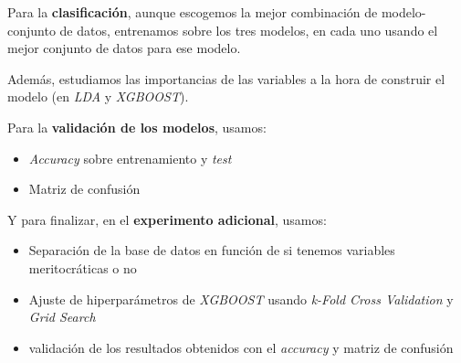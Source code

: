 \documentclass[11pt]{article}
\begin{document}
Para la \textbf{clasificación}, aunque escogemos la mejor combinación de modelo-conjunto de datos, entrenamos sobre los tres modelos, en cada uno usando el mejor conjunto de datos para ese modelo.

Además, estudiamos las importancias de las variables a la hora de construir el modelo (en \textit{LDA} y \textit{XGBOOST}).

Para la \textbf{validación de los modelos}, usamos:

\begin{itemize}
    \item \textit{Accuracy} sobre entrenamiento y \textit{test}
    \item Matriz de confusión
\end{itemize}

Y para finalizar, en el \textbf{experimento adicional}, usamos:

\begin{itemize}
    \item Separación de la base de datos en función de si tenemos variables meritocráticas o no
    \item Ajuste de hiperparámetros de \textit{XGBOOST} usando \textit{k-Fold Cross Validation} y \textit{Grid Search}
    \item validación de los resultados obtenidos con el \textit{accuracy} y matriz de confusión
\end{itemize}



\newpage


\newpage


\newpage


\newpage

\pagebreak





\end{document}

